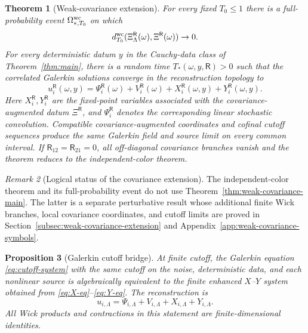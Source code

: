 \documentclass[10pt]{amsart}
\numberwithin{equation}{section}
\theoremstyle{plain}
\newtheorem{theorem}{Theorem}[section]
\newtheorem{proposition}[theorem]{Proposition}
\theoremstyle{definition}
\theoremstyle{remark}
\newtheorem{remark}[theorem]{Remark}
\begin{document}
\begin{theorem}[Weak-covariance extension]
For every fixed \(T_0\le1\) there is a full-probability event \(\Omega^{\rm wc}_{*,T_0}\) on which
\begin{equation}\label{eq:wc-main-pathwise-dT}
        d_{T_0}^{\rm wc}(\Xi_\Lambda^{\mathsf R}(\omega),\Xi^{\mathsf R}(\omega))\to0.
\end{equation}
For every deterministic datum \(y\) in the Cauchy-data class of Theorem~\ref{thm:main}, there is a random time \(T_*(\omega,y,\mathsf R)>0\) such that the correlated Galerkin solutions converge in the reconstruction topology to
\begin{equation}\label{eq:wc-main-solution-formula}
        u_i^{\mathsf R}(\omega,y)=\Psi_i^{\mathsf R}(\omega)+V_i^{\mathsf R}(\omega)+X_i^{\mathsf R}(\omega,y)+Y_i^{\mathsf R}(\omega,y).
\end{equation}
Here \(X_i^{\mathsf R},Y_i^{\mathsf R}\) are the fixed-point variables associated with the covariance-augmented datum \(\Xi^{\mathsf R}\), and \(\Psi_i^{\mathsf R}\) denotes the corresponding linear stochastic convolution.
Compatible covariance-augmented coordinates and cofinal cutoff sequences produce the same Galerkin field and source limit on every common interval.  If \(\mathsf R_{12}=\mathsf R_{21}=0\), all off-diagonal covariance branches vanish and the theorem reduces to the independent-color theorem.
\end{theorem}

\begin{remark}[Logical status of the covariance extension]
The independent-color theorem and its full-probability event do not use Theorem~\ref{thm:weak-covariance-main}.  The latter is a separate perturbative result whose additional finite Wick branches, local covariance coordinates, and cutoff limits are proved in Section~\ref{subsec:weak-covariance-extension} and Appendix~\ref{app:weak-covariance-symbols}.
\end{remark}



\begin{proposition}[Galerkin cutoff bridge]\label{prop:finite-cutoff-bridge}
At finite cutoff, the Galerkin equation \eqref{eq:cutoff-system} with the same cutoff on the noise, deterministic data, and each nonlinear source is algebraically equivalent to the finite enhanced $X$--$Y$ system obtained from \eqref{eq:X-eq}--\eqref{eq:Y-eq}.  The reconstruction is
\[
        u_{i,\Lambda}=\Psi_{i,\Lambda}+V_{i,\Lambda}+X_{i,\Lambda}+Y_{i,\Lambda}.
\]
All Wick products and contractions in this statement are finite-dimensional identities.
\end{proposition}
\end{document}
